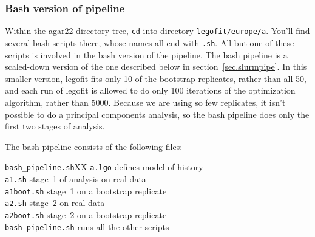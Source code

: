 \documentclass[11pt]{article}
\newenvironment{leftindent}%
{\begin{list}{}%
         {\setlength{\leftmargin}{2em}}%
         \item[]%
}{\end{list}}
\begin{document}
\subsubsection{Bash version of pipeline}
\label{sec.bashpipe}
Within the agar22 directory tree, \texttt{cd} into directory
\texttt{legofit/europe/a}. You'll find several bash scripts there,
whose names all end with \texttt{.sh}. All but one of these scripts is
involved in the bash version of the pipeline. The bash pipeline is a
scaled-down version of the one described below in
section~\ref{sec.slurmpipe}. In this smaller version, legofit fits
only 10 of the bootstrap replicates, rather than all 50, and each run
of legofit is allowed to do only 100 iterations of the optimization
algorithm, rather than 5000. Because we are using so few replicates,
it isn't possible to do a principal components analysis, so the bash
pipeline does only the first two stages of analysis.

The bash pipeline consists of the following files:
\begin{leftindent}
\begin{tabbing}
\verb|bash_pipeline.sh|XX\=\kill
\texttt{a.lgo} \> defines model of history\\    
\texttt{a1.sh} \> stage~1 of analysis on real data\\
\texttt{a1boot.sh} \> stage~1 on a bootstrap replicate\\
\texttt{a2.sh} \> stage~2 on real data\\
\texttt{a2boot.sh} \> stage~2 on a bootstrap replicate\\
\verb|bash_pipeline.sh| \> runs all the other scripts
\end{tabbing}
\end{leftindent}
\end{document}
